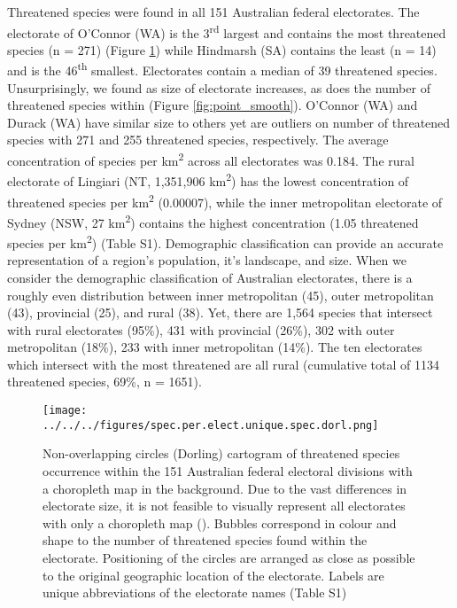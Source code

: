 \documentclass[a4paper,11pt]{article}
\begin{document}
Threatened species were found in all 151 Australian federal electorates. The electorate of O'Connor (WA) is the 3\textsuperscript{rd} largest and contains the most threatened species (n =  271) (Figure \ref{fig:dorl}) while Hindmarsh (SA) contains the least (n = 14) and is the 46\textsuperscript{th} smallest. Electorates contain a median of 39 threatened species. Unsurprisingly, we found as size of electorate increases, as does the number of threatened species within (Figure \ref{fig:point_smooth}). O'Connor (WA) and Durack (WA) have similar size to others yet are outliers on number of threatened species with 271 and 255 threatened species, respectively. The average concentration of species per km\textsuperscript{2} across all electorates was 0.184. The rural electorate of Lingiari (NT, 1,351,906 km\textsuperscript{2}) has the lowest concentration of threatened species per km\textsuperscript{2} (0.00007), while the inner metropolitan electorate of Sydney (NSW, 27 km\textsuperscript{2}) contains the highest concentration (1.05 threatened species per km\textsuperscript{2}) (Table S1). Demographic classification can provide an accurate representation of a region's population, it's landscape, and size. When we consider the demographic classification of Australian electorates, there is a roughly even distribution between inner metropolitan (45), outer metropolitan (43), provincial (25), and rural (38). Yet, there are 1,564 species that intersect with rural electorates (95\%), 431 with provincial (26\%), 302 with outer metropolitan (18\%), 233 with inner metropolitan (14\%). The ten electorates which intersect with the most threatened are all rural (cumulative total of 1134 threatened species, 69\%, n = 1651).

\begin{figure}[H]
	\centering
    \texttt{[image: ../../../figures/spec.per.elect.unique.spec.dorl.png]}
    \caption{Non-overlapping circles (Dorling) cartogram of threatened species occurrence within the 151 Australian federal electoral divisions with a choropleth map in the background. Due to the vast differences in electorate size, it is not feasible to visually represent all electorates with only a choropleth map (\cite{tomasettiMappingAustraliaElectorates2021}). Bubbles correspond in colour and shape to the number of threatened species found within the electorate. Positioning of the circles are arranged as close as possible to the original geographic location of the electorate. Labels are unique abbreviations of the electorate names (Table S1)}
    \label{fig:dorl}
\end{figure}
\end{document}
